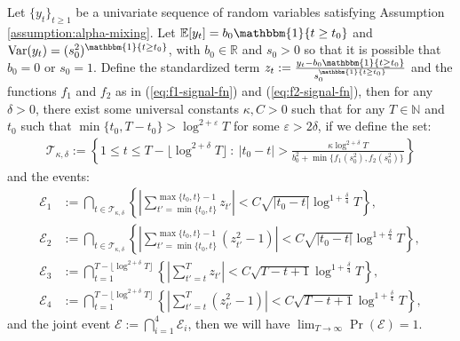 \begin{lemma}\label{lemma:thm4-event-bound}

Let $\{y_t\}_{t\geq 1}$ be a univariate sequence of random variables satisfying Assumption \ref{assumption:alpha-mixing}. Let $\E[y_t] = b_0\mathbbm{1}\{t\geq t_0\}$ and $\normalfont{\Var}(y_t) = (s_0^2)^{\mathbbm{1}\{t\geq t_0\}}$, with $b_0 \in \mathbb{R}$ and $s_0 > 0$ so that it is possible that $b_0 = 0$ or $s_0 = 1$. Define the standardized term $z_t:= \frac{y_t - b_0\mathbbm{1}\{t\geq t_0\}}{s_0^{\mathbbm{1}\{t\geq t_0\}}}$ and the functions $f_1$ and $f_2$ as in (\ref{eq:f1-signal-fn}) and (\ref{eq:f2-signal-fn}), then for any $\delta > 0$, there exist some universal constants $\kappa, C > 0$ such that for any $T\in\mathbb{N}$ and $t_0$ such that $\min\{t_0,T-t_0\} > \log^{2+\varepsilon} T$ for some $\varepsilon > 2\delta$, if we define the set:
\begin{align*}
    \mathcal{T}_{\kappa,\delta}:= \left\{1\leq t \leq T - \lfloor\log^{2 + \delta} T\rfloor \::\: |t_0 - t| > \frac{\kappa\log^{2 + \delta} T}{b^2_0 + \min\{f_1(s_0^2),f_2(s_0^2)\}} \right\}
\end{align*}
and the events: 
\begin{align*}
    \mathcal{E}_1 &:= \bigcap_{t \in \mathcal{T}_{\kappa, \delta}} \left\{\left|\sum_{t'=\min\{t_0,t\}}^{\max\{t_0,t\}-1} z_{t'}\right| < C\sqrt{|t_0-t|}\log^{1+\frac{\delta}{4}} T\right\}, \\
    \mathcal{E}_2 &:= \bigcap_{t \in \mathcal{T}_{\kappa, \delta}} \left\{\left|\sum_{t'=\min\{t_0,t\}}^{\max\{t_0,t\}-1} (z_{t'}^2 - 1) \right| <  C\sqrt{|t_0-t|}\log^{1+\frac{\delta}{4}} T  \right\},  \\
    \mathcal{E}_3 &:= \bigcap_{t=1}^{T- \lfloor\log^{2 +\delta} T\rfloor }  \left\{\left|\sum_{t'=t}^{T} z_{t'}\right| < C\sqrt{T-t+1}\log^{1+\frac{\delta}{4}} T  \right\}, \\
    \mathcal{E}_4 &:= \bigcap_{t=1}^{T- \lfloor\log^{2 +\delta} T \rfloor} \left\{\left|\sum_{t'=t}^{T} (z_{t'}^2 - 1) \right| <  C\sqrt{T-t+1}\log^{1+\frac{\delta}{4}} T  \right\},
\end{align*}
and the joint event $\mathcal{E} := \bigcap_{i=1}^4 \mathcal{E}_i$, then we will have $\lim_{T\to\infty} \Pr(\mathcal{E}) = 1$. 
\end{lemma}

